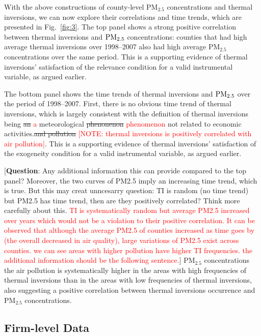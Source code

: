 \documentclass[12pt]{article}
\begin{document}
With the above constructions of county-level $\mathrm{PM_{2.5}}$
concentrations and thermal inversions, we can now explore their correlations
and time trends, which are presented in Fig.~\ref{fig:3}. The top panel
shows a strong positive correlation between thermal inversions and $\mathrm{%
PM_{2.5}}$ concentrations: counties that had high average thermal inversions
over 1998--2007 also had high average $\mathrm{PM_{2.5}}$ concentrations
over the same period. This is a supporting evidence of thermal inversions'
satisfaction of the relevance condition for a valid instrumental variable,
as argued earlier. 

The bottom panel shows the time trends of thermal inversions and $\mathrm{%
PM_{2.5}}$ over the period of 1998--2007. First, there is no obvious time
trend of thermal inversions, which is largely consistent with the definition
of thermal inversions being \sout{an} \textcolor{red}{a} meteorological \sout{phenonenon} \textcolor{red}{phenomenon} not related to
economic activities.\sout{and pollution} \textcolor{red}{[NOTE: thermal inversions is positively correlated with air pollution]}. This is a supporting evidence of thermal
inversions' satisfaction of the exogeneity condition for a valid
instrumental variable, as argued earlier. 

[\textbf{Question}: Any additional information this can provide compared to
the top panel? Moreover, the two curves of PM2.5 imply an increasing time
trend, which is true. But this may creat unncesarry question: TI is random
(no time trend) but PM2.5 has time trend, then are they positively
correlated? Think more carefully about this. \textcolor{red}{TI is systematically random but average PM2.5 increased over years which would not be a violation to their positive correlation. It can be observed that although the average PM2.5 of counties increased as time goes by (the overall decreased in air quality), large variations of PM2.5 exist across counties. we can see areas with higher pollution have higher TI frequencies. the additional information should be the following sentence.}] $\mathrm{PM_{2.5}}$
concentrations the air pollution is systematically higher in the areas with
high frequencies of thermal inversions than in the areas with low frequencies of thermal inversions, also suggesting a
positive correlation between thermal inversions occurrence and $\mathrm{PM_{2.5}}$
concentrations.


\subsection{Firm-level Data}
\end{document}
